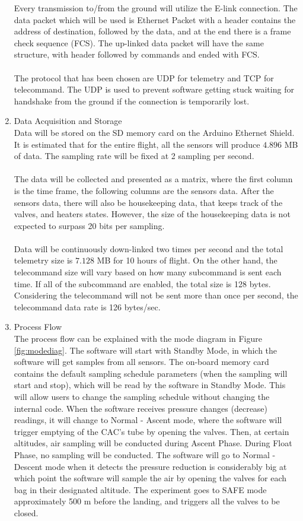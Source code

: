\begin{enumerate}[label=(\alph*)]
Every transmission to/from the ground will utilize the E-link connection. The data packet which will be used is Ethernet Packet with a header contains the address of destination, followed by the data, and at the end there is a frame check sequence (FCS). The up-linked data packet will have the same structure, with header followed by commands and ended with FCS.\\
\\
The protocol that has been chosen are UDP for telemetry and TCP for telecommand. The UDP is used to prevent software getting stuck waiting for handshake from the ground if the connection is temporarily lost.
\item{Data Acquisition and Storage}\\
Data will be stored on the SD memory card on the Arduino Ethernet Shield. It is estimated that for the entire flight, all the sensors will produce $4.896$ MB of data. The sampling rate will be fixed at 2 sampling per second.\\
\\
The data will be collected and presented as a matrix, where the first column is the time frame, the following columns are the sensors data. After the sensors data, there will also be housekeeping data, that keeps track of the valves, and heaters states. However, the size of the housekeeping data is not expected to surpass 20 bits per sampling.\\
\\
Data will be continuously down-linked two times per second and the total telemetry size is $7.128$ MB for 10 hours of flight. On the other hand, the telecommand size will vary based on how many subcommand is sent each time. If all of the subcommand are enabled, the total size is 128 bytes. Considering the telecommand will not be sent more than once per second, the telecommand data rate is 126 bytes/sec.
\item{Process Flow}\\
The process flow can be explained with the mode diagram in Figure \ref{fig:modediag}. The software will start with Standby Mode, in which the software will get samples from all sensors. The on-board memory card contains the default sampling schedule parameters (when the sampling will start and stop), which will be read by the software in Standby Mode. This will allow users to change the sampling schedule without changing the internal code. When the software receives pressure changes (decrease) readings, it will change to Normal - Ascent mode, where the software will trigger emptying of the CAC's tube by opening the valves. Then, at certain altitudes, air sampling will be conducted during Ascent Phase. During Float Phase, no sampling will be conducted. The software will go to Normal - Descent mode when it detects the pressure reduction is considerably big at which point the software will sample the air by opening the valves for each bag in their designated altitude. The experiment goes to SAFE mode approximately 500 m before the landing, and triggers all the valves to be closed.


\end{enumerate}
